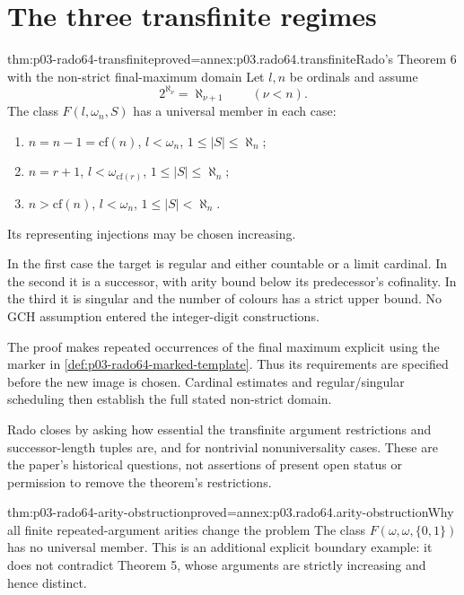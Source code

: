 \section{The three transfinite regimes}
\label{sec:p03-rado64-transfinite-theorem}

\begin{hbtheorem}{thm:p03-rado64-transfinite}{proved=annex:p03.rado64.transfinite}{Rado's Theorem 6 with the non-strict final-maximum domain}
Let \(l,n\) be ordinals and assume
\[
 2^{\aleph_\nu}=\aleph_{\nu+1}\qquad(\nu<n).
\]
The class \(F(l,\omega_n,S)\) has a universal member in each case:
\begin{enumerate}
\item \(n=n-1=\mathrm{cf}(n)\), \(l<\omega_n\), \(1\leq|S|\leq\aleph_n\);
\item \(n=r+1\), \(l<\omega_{\mathrm{cf}(r)}\), \(1\leq|S|\leq\aleph_n\);
\item \(n>\mathrm{cf}(n)\), \(l<\omega_n\), \(1\leq|S|<\aleph_n\).
\end{enumerate}
Its representing injections may be chosen increasing.
\end{hbtheorem}

In the first case the target is regular and either countable or a limit
cardinal. In the second it is a successor, with arity bound below its
predecessor's cofinality. In the third it is singular and the number of
colours has a strict upper bound. No GCH assumption entered the integer-digit
constructions.

The proof makes repeated occurrences of the final maximum explicit using
the marker in \cref{def:p03-rado64-marked-template}. Thus its requirements
are specified before the new image is chosen. Cardinal estimates and
regular/singular scheduling then establish the full stated non-strict domain.

Rado closes by asking how essential the transfinite argument restrictions
and successor-length tuples are, and for nontrivial nonuniversality cases.
These are the paper's historical questions, not assertions of present open
status or permission to remove the theorem's restrictions.

\begin{hbtheorem}{thm:p03-rado64-arity-obstruction}{proved=annex:p03.rado64.arity-obstruction}{Why all finite repeated-argument arities change the problem}
The class \(F(\omega,\omega,\{0,1\})\) has no universal member.
This is an additional explicit boundary example: it does not contradict
Theorem 5, whose arguments are strictly increasing and hence distinct.
\end{hbtheorem}

